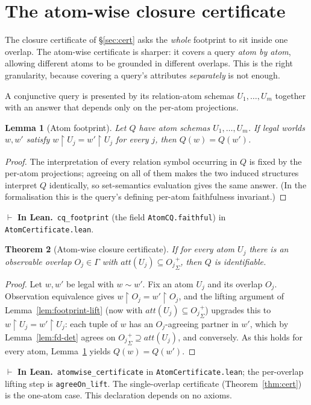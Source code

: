 \documentclass[11pt]{article}
\newcommand{\att}[1]{\mathit{att}(#1)}
\newcommand{\clo}[1]{{#1}^{+}_{\Sigma}}      %
\newcommand{\ObsFam}{\Gamma}                 %
\newcommand{\proj}[2]{#1{\restriction}#2}    %
\newcommand{\lean}[1]{\texttt{#1}}           %
\theoremstyle{plain}
\newtheorem{theorem}{Theorem}
\newtheorem{lemma}[theorem]{Lemma}
\theoremstyle{definition}
\newcommand{\inlean}[1]{\par\smallskip\noindent%
  {\small\textcolor{blue!50!black}{$\vdash$ \textbf{In Lean.}}~#1}\par\smallskip}
\begin{document}
\section{The atom-wise closure certificate}\label{sec:atom}

The closure certificate of \S\ref{sec:cert} asks the \emph{whole} footprint to sit inside one
overlap. The atom-wise certificate is sharper: it covers a query \emph{atom by atom}, allowing
different atoms to be grounded in different overlaps. This is the right granularity, because
covering a query's attributes \emph{separately} is not enough.

A conjunctive query is presented by its relation-atom schemas $U_1,\dots,U_m$ together with an
answer that depends only on the per-atom projections.

\begin{lemma}[Atom footprint]\label{lem:cq-footprint}
Let $Q$ have atom schemas $U_1,\dots,U_m$. If legal worlds $w,w'$ satisfy
$\proj w{U_j}=\proj{w'}{U_j}$ for every $j$, then $Q(w)=Q(w')$.
\end{lemma}
\begin{proof}
The interpretation of every relation symbol occurring in $Q$ is fixed by the per-atom
projections; agreeing on all of them makes the two induced structures interpret $Q$
identically, so set-semantics evaluation gives the same answer. (In the formalisation this is
the query's defining per-atom faithfulness invariant.)
\end{proof}
\inlean{\lean{cq\_footprint} (the field \lean{AtomCQ.faithful}) in \lean{AtomCertificate.lean}.}

\begin{theorem}[Atom-wise closure certificate]\label{thm:atomwise}
If for every atom $U_j$ there is an observable overlap $O_j\in\ObsFam$ with
$\att{U_j}\subseteq\clo{O_j}$, then $Q$ is identifiable.
\end{theorem}
\begin{proof}
Let $w,w'$ be legal with $w\sim w'$. Fix an atom $U_j$ and its overlap $O_j$. Observation
equivalence gives $\proj w{O_j}=\proj{w'}{O_j}$, and the lifting argument of
Lemma~\ref{lem:footprint-lift} (now with $\att{U_j}\subseteq\clo{O_j}$) upgrades this to
$\proj w{U_j}=\proj{w'}{U_j}$: each tuple of $w$ has an $O_j$-agreeing partner in $w'$, which
by Lemma~\ref{lem:fd-det} agrees on $\clo{O_j}\supseteq\att{U_j}$, and conversely. As this
holds for every atom, Lemma~\ref{lem:cq-footprint} yields $Q(w)=Q(w')$.
\end{proof}
\inlean{\lean{atomwise\_certificate} in \lean{AtomCertificate.lean}; the per-overlap lifting
step is \lean{agreeOn\_lift}. The single-overlap certificate (Theorem~\ref{thm:cert}) is the
one-atom case. This declaration depends on no axioms.}
\end{document}

